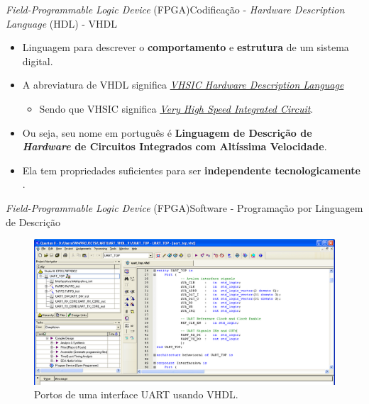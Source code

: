     \begin{frame}{\textit{Field-Programmable Logic Device} (FPGA)}{Codificação - \textit{Hardware Description Language} (HDL) - VHDL}
    \begin{itemize}
    \setlength\itemsep{1.3em}
    \item Linguagem para descrever o \textbf{comportamento} e \textbf{estrutura} de um sistema digital.
    
    \item A abreviatura de VHDL significa \textit{\underline{VHSIC Hardware Description Language}}
    \begin{itemize}
    \item Sendo que VHSIC significa \textit{\underline{Very High Speed Integrated Circuit}}.
    \end{itemize}
    
    \item Ou seja, seu nome em português é \textbf{Linguagem de Descrição de \textit{Hardware} de Circuitos Integrados com Altíssima Velocidade}.
    
    \item Ela tem propriedades suficientes para ser \textbf{independente tecnologicamente} \cite{Roth1998}.
    \end{itemize}
    \end{frame}
    
    
    \begin{frame}{\textit{Field-Programmable Logic Device} (FPGA)}{Software - Programação por Linguagem de Descrição}
    \vspace{-1em}
    \begin{figure}[p]
        \centering
        \includegraphics[width=1\textwidth]{img/fpga/software_quartus_vhdl.png}
        \caption{Portos de uma interface UART usando VHDL.}
        \label{fig:alteraquartus_portas}
    \end{figure}
    \end{frame}
    
